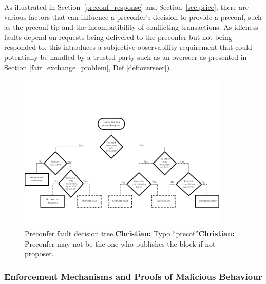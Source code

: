 \documentclass[a4paper]{article}
\theoremstyle{boldstyle}
\newcommand{\cm}[1]{\textcolor{blue}{\textbf{Conor:} #1}}
\newcommand{\dk}[1]{\textcolor{cyan}{\textbf{Demetris:} #1}}
\newcommand{\chm}[1]{\textcolor{OliveGreen}{\textbf{Christian:} #1}}
\begin{document}
        As illustrated in Section~\ref{preconf_response} and Section~\ref{sec:price}, there are various factors that can influence a preconfer's decision to provide a preconf, such as the preconf tip and the incompatibility of conflicting transactions. As idleness faults depend on requests being delivered to the preconfer but not being responded to, this introduces a subjective observability requirement that could potentially be handled by a trusted party such as an overseer as presented in Section \ref{fair_exchange_problem}, Def \ref{def:overseer}).
        

    \begin{figure}[htbp]
        \centering
        \includegraphics[width=0.9\textwidth]{figures/preconferFaultDecisionTree.png}
        \caption{Preconfer fault decision tree.\chm{Typo ``precof''}\chm{Preconfer may not be the one who publishes the block if not proposer.}}
        \label{preconfer fault tree}
    \end{figure}
    

\subsubsection{Enforcement Mechanisms and Proofs of Malicious Behaviour}
\label{sec:enforcement}
\end{document}
